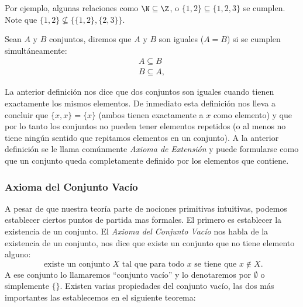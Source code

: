 Por ejemplo, algunas relaciones como $\N\subseteq\Z$, o $\{1,2\}\subseteq\{1,2,3\}$ se cumplen.
Note que $\{1,2\}\not\subseteq\{\{1,2\},\{2,3\}\}$.

\begin{definicion}
Sean $A$ y $B$ conjuntos, diremos que $A$ y $B$ son iguales ($A=B$) si se cumplen simultáneamente:
\[
\begin{array}{c}
A\subseteq B\\
B\subseteq A,
\end{array}
\]
\end{definicion}

La anterior definición nos dice que dos conjuntos son iguales cuando tienen exactamente los mismos elementos.
De inmediato esta definición nos lleva a concluir que $\{x,x\}=\{x\}$ (ambos tienen exactamente a $x$ como elemento) y que por lo tanto los conjuntos no pueden tener elementos repetidos (o al menos no tiene ningún sentido que repitamos elementos en un conjunto). 
A la anterior definición se le llama comúnmente \emph{Axioma de Extensión} y puede formularse como que un conjunto queda completamente definido por los elementos que contiene.

\subsubsection*{Axioma del Conjunto Vacío}
A pesar de que nuestra teoría parte de nociones primitivas intuitivas, podemos establecer ciertos puntos de partida mas formales.
El primero es establecer la existencia de un conjunto.
El \emph{Axioma del Conjunto Vacío} nos habla de la existencia de un conjunto, nos dice que existe un conjunto que no tiene elemento alguno:
\[
\text{ existe un conjunto }X\text{ tal que para todo }x\text{ se tiene que }x\notin X.
\]
A ese conjunto lo llamaremos ``conjunto vacío'' y lo denotaremos por $\emptyset$ o simplemente $\{\}$.
Existen varias propiedades del conjunto vacío, las dos más importantes las establecemos en el siguiente teorema:

